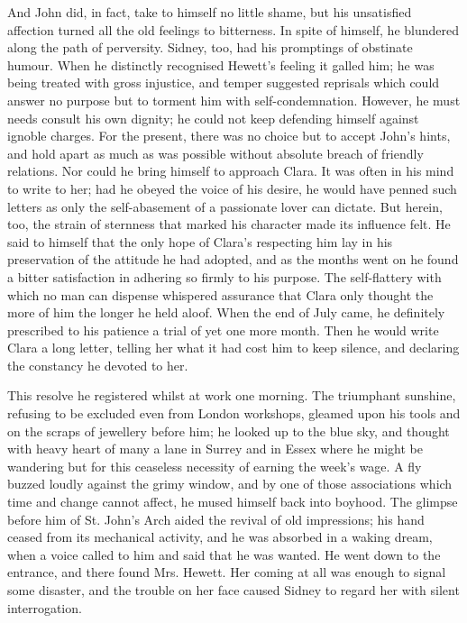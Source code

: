 And John did, in fact, take to himself no little shame, but his
unsatisfied affection turned all the old feelings to bitterness. In
spite of himself, he blundered along the path of perversity. Sidney,
too, had his promptings of obstinate humour. When he distinctly
recognised Hewett's feeling it galled him; he was being treated with
gross injustice, and temper suggested reprisals which could answer no
purpose but to torment him with self-condemnation. However, he must
needs consult his own dignity; he could not keep defending himself
against ignoble charges. For the present, there was no choice but to
accept John's hints, and hold apart as much as was
{\protect\hypertarget{218}{}{}}possible without absolute breach of
friendly relations. Nor could he bring himself to approach Clara. It was
often in his mind to write to her; had he obeyed the voice of his
desire, he would have penned such letters as only the self-abasement of
a passionate lover can dictate. But herein, too, the strain of sternness
that marked his character made its influence felt. He said to himself
that the only hope of Clara's respecting him lay in his preservation of
the attitude he had adopted, and as the months went on he found a bitter
satisfaction in adhering so firmly to his purpose. The self-flattery
with which no man can dispense whispered assurance that Clara only
thought the more of him the longer he held aloof. When the end of July
came, he definitely prescribed to his patience a trial of yet one more
month. Then he would write Clara a long letter, telling her what it had
cost him to keep silence, and declaring the constancy he devoted to her.

This resolve he registered whilst at work one morning. The triumphant
sunshine, {\protect\hypertarget{219}{}{}}refusing to be excluded even
from London workshops, gleamed upon his tools and on the scraps of
jewellery before him; he looked up to the blue sky, and thought with
heavy heart of many a lane in Surrey and in Essex where he might be
wandering but for this ceaseless necessity of earning the week's wage. A
fly buzzed loudly against the grimy window, and by one of those
associations which time and change cannot affect, he mused himself back
into boyhood. The glimpse before him of St. John's Arch aided the
revival of old impressions; his hand ceased from its mechanical
activity, and he was absorbed in a waking dream, when a voice called to
him and said that he was wanted. He went down to the entrance, and there
found Mrs. Hewett. Her coming at all was enough to signal some disaster,
and the trouble on her face caused Sidney to regard her with silent
interrogation.

